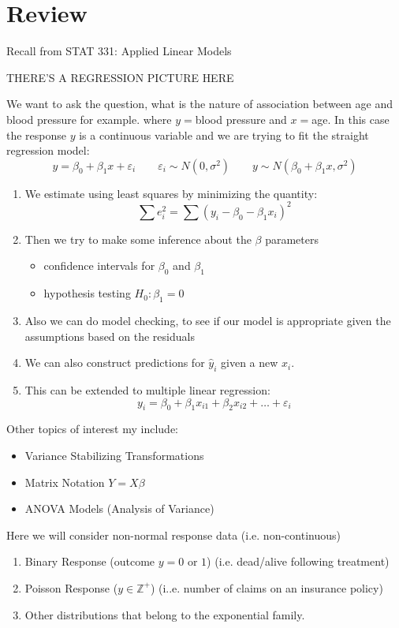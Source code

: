 \documentclass[english,12pt]{article}
\theoremstyle{plain}
\theoremstyle{definition}
\theoremstyle{definition} %
\begin{document}
\section{Review}
Recall from STAT 331: Applied Linear Models

THERE'S A REGRESSION PICTURE HERE

We want to ask the question, what is the nature of association between age and blood pressure for example.  where $y=$blood pressure and $x=$age.  In this case the response $y$ is a continuous variable and we are trying to fit the straight regression model:
\[y=\beta_0+\beta_1x+\varepsilon_i\qquad \varepsilon_i\sim N(0,\sigma^2)\qquad y\sim N(\beta_0+\beta_1x,\sigma^2)\]

\begin{enumerate}
\item We estimate using least squares by minimizing the quantity:
\[\sum e_i^2=\sum(y_i-\beta_0-\beta_1x_i)^2\]
\item Then we try to make some inference about the $\beta$ parameters
\begin{itemize}
\item confidence intervals for $\beta_0$ and $\beta_1$
\item hypothesis testing $H_0:\beta_1=0$
\end{itemize}
\item Also we can do model checking, to see if our model is appropriate given the assumptions based on the residuals
\item We can also construct predictions for $\hat y_i$ given a new $x_i$.
\item This can be extended to multiple linear regression:
\[y_i=\beta_0+\beta_1x_{i1}+\beta_2x_{i2}+\ldots+\varepsilon_i\]
\end{enumerate}

Other topics of interest my include:
\begin{itemize}
\item Variance Stabilizing Transformations
\item Matrix Notation $Y=X\beta$
\item ANOVA Models (Analysis of Variance)
\end{itemize}

Here we will consider non-normal response data (i.e. non-continuous)

\begin{enumerate}
\item Binary Response (outcome $y=0\text{ or }1$) (i.e. dead/alive following treatment)
\item Poisson Response ($y\in \mathbb{Z}^+$) (i..e. number of claims on an insurance policy)
\item Other distributions that belong to the exponential family.
\end{enumerate}
\end{document}
